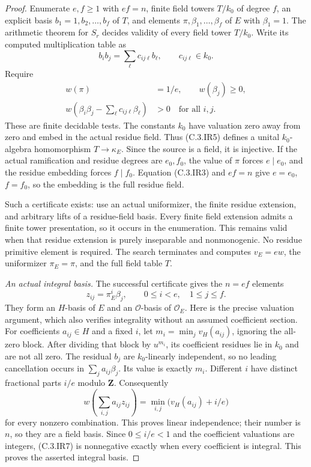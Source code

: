 \begin{proof}
Enumerate $e,f\ge1$ with $ef=n$,
finite field towers $T/k_0$ of
degree $f$, an explicit basis
$b_1=1,b_2,\ldots,b_f$ of $T$,
and elements $\pi,\beta_1,\ldots,\beta_f$
of $E$ with $\beta_1=1$.
The arithmetic theorem for $S_r$
decides validity of every field
tower $T/k_0$.
Write its computed multiplication
table as
\[
                 b_i b_j=\sum_\ell c_{ij\ell}b_\ell,
                       \qquad c_{ij\ell}\in k_0.
\]
Require
\[
 \begin{split}
 w(\pi)&=1/e,\qquad w(\beta_j)\ge0,\\
 w\left(\beta_i\beta_j-
                 \sum_\ell c_{ij\ell}\beta_\ell\right)&>0
                       \quad\text{for all }i,j.
 \end{split}                                           \tag{C.3.IR5}
\]
These are finite decidable tests.
The constants $k_0$ have valuation
zero away from zero and embed in
the actual residue field.
Thus (C.3.IR5) defines a unital
$k_0$-algebra homomorphism
$T\to\kappa_E$.
Since the source is a field,
it is injective.
If the actual ramification and
residue degrees are $e_0,f_0$,
the value of $\pi$ forces
$e\mid e_0$, and the residue
embedding forces $f\mid f_0$.
Equation (C.3.IR3) and $ef=n$
give $e=e_0$, $f=f_0$, so
the embedding is the full
residue field.

Such a certificate exists:
use an actual uniformizer,
the finite residue extension,
and arbitrary lifts of a
residue-field basis.
Every finite field extension
admits a finite tower
presentation, so it occurs
in the enumeration.
This remains valid when that
residue extension is purely
inseparable and nonmonogenic.
No residue primitive element
is required.
The search terminates and
computes $v_E=e w$, the
uniformizer $\pi_E=\pi$,
and the full field table $T$.

\emph{An actual integral basis.}
The successful certificate gives
the $n=ef$ elements
\[
         z_{ij}=\pi_E^i\beta_j,
             \qquad 0\le i<e,\quad1\le j\le f.         \tag{C.3.IR6}
\]
They form an $H$-basis of $E$
and an $\mathcal O$-basis of
$\mathcal O_E$.
Here is the precise valuation
argument, which also verifies
integrality without an assumed
coefficient section.
For coefficients $a_{ij}\in H$
and a fixed $i$, let
$m_i=\min_j v_H(a_{ij})$,
ignoring the all-zero block.
After dividing that block by
$u^{m_i}$, its coefficient
residues lie in $k_0$ and
are not all zero.
The residual $b_j$ are
$k_0$-linearly independent,
so no leading cancellation
occurs in $\sum_j a_{ij}\beta_j$.
Its value is exactly $m_i$.
Different $i$ have distinct
fractional parts $i/e$ modulo
$\mathbf Z$.  Consequently
\[
 w\left(\sum_{i,j}a_{ij}z_{ij}\right)
       =\min_{i,j}\bigl(v_H(a_{ij})+i/e\bigr)          \tag{C.3.IR7}
\]
for every nonzero combination.
This proves linear independence;
their number is $n$, so they
are a field basis.
Since $0\le i/e<1$ and the
coefficient valuations are
integers, (C.3.IR7) is nonnegative
exactly when every coefficient
is integral.  This proves
the asserted integral basis.


\end{proof}
